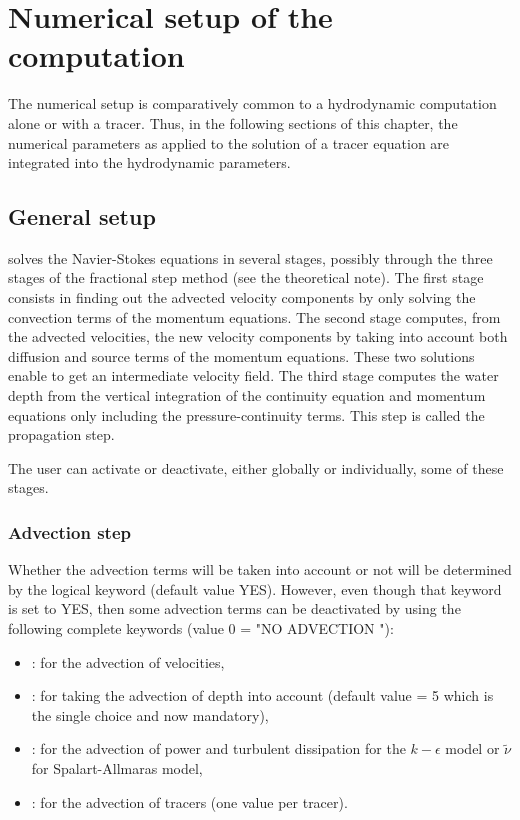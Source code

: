 \chapter{Numerical setup of the computation}

The numerical setup is comparatively common to a hydrodynamic computation alone
or with a tracer. Thus, in the following sections of this chapter, the
numerical parameters as applied to the solution of a tracer equation are
integrated into the hydrodynamic parameters.

\section{General setup}

 solves the Navier-Stokes equations in several stages, possibly
through the three stages of the fractional step method (see the theoretical
note). The first stage consists in finding out the advected velocity components
by only solving the convection terms of the momentum equations. The second
stage computes, from the advected velocities, the new velocity components by
taking into account both diffusion and source terms of the momentum equations.
These two solutions enable to get an intermediate velocity field. The third
stage computes the water depth from the vertical integration of the continuity
equation and momentum equations only including the pressure-continuity terms.
This step is called the propagation step.

The user can activate or deactivate, either globally or individually, some of
these stages.


\subsection{Advection step}
\label{sec:advstep}
Whether the advection terms will be taken into account or not will be
determined by the logical keyword  (default
value YES). However, even though that keyword is set to YES, then some
advection terms can be deactivated by using the following complete keywords
(value 0 = "NO ADVECTION "):

\begin{itemize}
\item {}: for the advection of
velocities,

\item {}: for taking the advection of
depth into account (default value = 5 which is the single choice and now
mandatory),

\item {}: for the advection of power
and turbulent dissipation for the $k-\epsilon$ model or $\tilde{\nu}$ for
Spalart-Allmaras model,

\item {}: for the advection of tracers
(one value per tracer).
\end{itemize}

